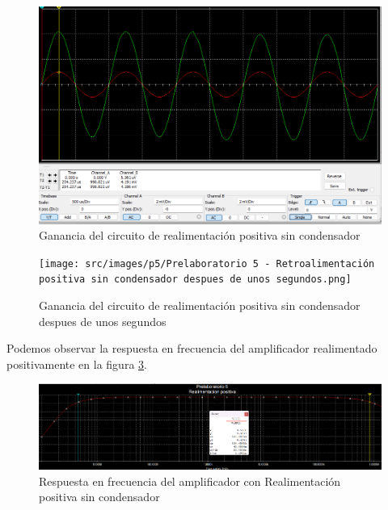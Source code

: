 \begin{figure}[ht]
    \centering
    \includegraphics[width=\textwidth]{src/images/p5/Prelaboratorio 5 - Realimentacion positiva sin condensador - ganancia.png}
    \caption{Ganancia del circuito de realimentación positiva sin condensador}
    \label{fig:ganancia-circuito-realimentacion-positiva-sin-condensador}
\end{figure}
\FloatBarrier


\begin{figure}[ht]
    \centering
    \texttt{[image: src/images/p5/Prelaboratorio 5 - Retroalimentación positiva sin condensador despues de unos segundos.png]}
    \caption{Ganancia del circuito de realimentación positiva sin condensador despues de unos segundos}
    \label{fig:ganancia-circuito-realimentacion-positiva-sin-condensador-despues-de-unos-segundos}
\end{figure}
\FloatBarrier

Podemos observar la respuesta en frecuencia del amplificador realimentado positivamente en la figura \ref{fig:respuesta-amplificador-realimentacion-positiva-sin-condensador}.

\begin{figure}[ht]
    \centering
    \includegraphics[width=\textwidth]{src/images/p5/Prelaboratorio 5 - realimentacion positiva sin condensador - respuesta en frecuencia.png}
    \caption{Respuesta en frecuencia del amplificador con Realimentación positiva sin condensador} 
    \label{fig:respuesta-amplificador-realimentacion-positiva-sin-condensador}
\end{figure}

